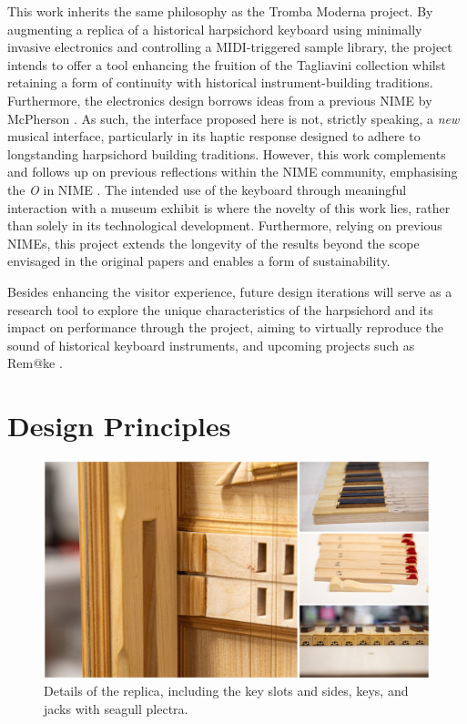 This work inherits the same philosophy as the Tromba Moderna project. By augmenting a replica of a historical harpsichord keyboard using minimally invasive electronics and controlling a MIDI-triggered sample library, the project intends to offer a tool enhancing the fruition of the Tagliavini collection whilst retaining a form of continuity with historical instrument-building traditions. Furthermore, the electronics design borrows ideas from a previous NIME by McPherson \cite{McPherson2013}. As such, the interface proposed here is not, strictly speaking, a \emph{new} musical interface, particularly in its haptic response designed to adhere to longstanding harpsichord building traditions. However, this work complements and follows up on previous reflections within the NIME community, emphasising the \emph{O} in NIME \cite{Masu_NIME_2023}. 
The intended use of the keyboard through meaningful interaction with a museum exhibit is where the novelty of this work lies, rather than solely in its technological development. Furthermore, relying on previous NIMEs, this project extends the longevity of the results beyond the scope envisaged in the original papers and enables a form of sustainability. 

Besides enhancing the visitor experience, future design iterations will serve as a research tool to explore the unique characteristics of the harpsichord and its impact on performance through the  project, aiming to virtually reproduce the sound of historical keyboard instruments, and upcoming projects such as Rem@ke \cite{remake1}.

\section{Design Principles}\label{design}

\begin{figure}
\includegraphics[width=\linewidth]{src/images/details.jpg}
\caption{Details of the replica, including the key slots and sides, keys, and jacks with seagull plectra.}\label{fig:details}
\end{figure}

